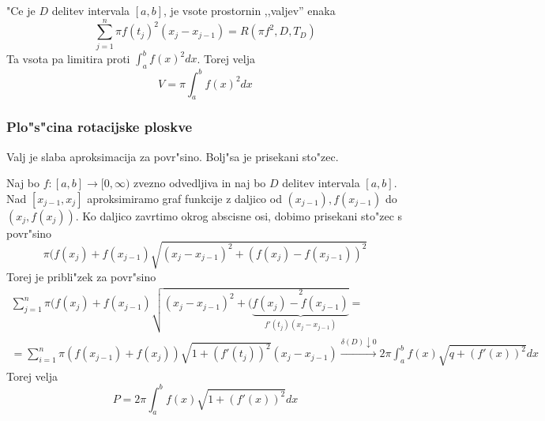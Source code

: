 "Ce je $D$ delitev intervala $[a, b]$, je vsote prostornin ,,valjev'' enaka
\begin{equation}\label{key}
\sum_{j = 1}^{n} \pi f(t_j)^2 (x_j - x_{j - 1}) = R(\pi f^2, D, T_D)
\end{equation}
Ta vsota pa limitira proti $\int_a^b f(x)^2 dx$. Torej velja
\begin{equation*}
V = \pi \int_a^b f(x)^2 dx
\end{equation*}

\subsubsection*{Plo"s"cina rotacijske ploskve}
Valj je slaba aproksimacija za povr"sino. Bolj"sa je prisekani sto"zec.

Naj bo $f: [a, b] \to [0, \infty)$ zvezno odvedljiva in naj bo $D$ delitev intervala $[a, b]$. Nad $[x_{j-1}, x_j]$ aproksimiramo graf funkcije z daljico od $(x_{j-1}), f(x_{j-1})$ do $(x_j, f(x_j))$. Ko daljico zavrtimo okrog abscisne osi, dobimo prisekani sto"zec s povr"sino
\begin{equation*}
\pi (f(x_j) + f(x_{j-1}) \sqrt{(x_j - x_{j-1})^2 + (f(x_j) - f(x_{j-1}))^2}
\end{equation*}
Torej je pribli"zek za povr"sino
\begin{multline*}
\sum_{j=1}^{n} \pi (f(x_j) + f(x_{j-1}) \sqrt{(x_j - x_{j-1})^2 + (\underbrace{f(x_j) - f(x_{j-1})}_{f'(t_j) (x_j - x_{j-1})}^2} = \\
= \sum_{i=1}^n \pi ( f(x_{j-1}) + f(x_j)) \sqrt{1 + (f'(t_j))^2} (x_j - x_{j-1}) \stackrel{\delta(D) \downarrow 0}{\longrightarrow} 2\pi \int_a^b f(x) \sqrt{q + (f'(x))^2} dx
\end{multline*}
Torej velja
\begin{equation*}
P = 2\pi \int_a^b f(x) \sqrt{1 + (f'(x))^2} dx
\end{equation*}